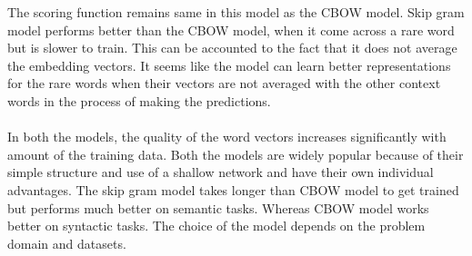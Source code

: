 The scoring function remains same in this model as the CBOW model. Skip gram model performs better than the CBOW model, when it come across a rare word but is slower to train. This can be accounted to the fact that it does not average the embedding vectors. It seems like the model can learn better representations for the rare words when their vectors are not averaged with the other context words in the process of making the predictions.\\\\
In both the models, the quality of the word vectors increases significantly with amount of the training data. Both the models are widely popular because of their simple structure and use of a shallow network and have their own individual advantages. The skip gram model takes longer than CBOW model to get trained but performs much better on semantic tasks. Whereas CBOW model works better on syntactic tasks. The choice of the model depends on the problem domain and datasets.
